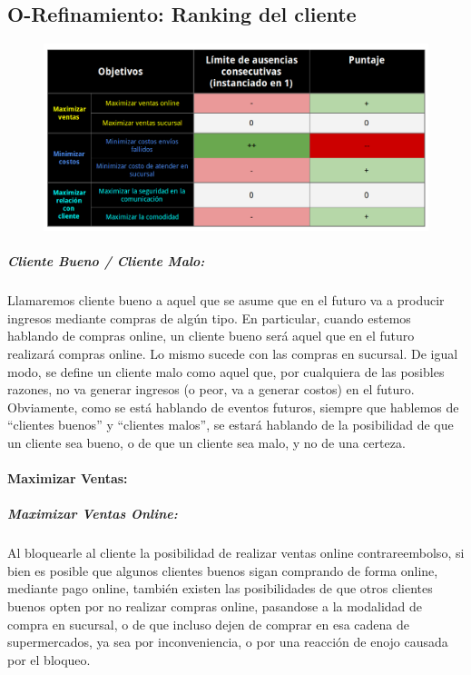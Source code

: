 \newpage
\subsection{O-Refinamiento: Ranking del cliente}
\begin{figure}[H]
  \includegraphics[width=\linewidth]{tp1/images/objetivo-blando-ranking-cliente.png}
\end{figure}

\subparagraph{Cliente Bueno / Cliente Malo:}

Llamaremos cliente bueno a aquel que se asume que en el futuro va a producir
ingresos mediante compras de algún tipo. En particular, cuando estemos
hablando de compras online, un cliente bueno será aquel que en el futuro
realizará compras online. Lo mismo sucede con las compras en sucursal. De
igual modo, se define un cliente malo como aquel que, por cualquiera de las
posibles razones, no va generar ingresos (o peor, va a generar costos) en el
futuro. Obviamente, como se está hablando de eventos futuros, siempre que
hablemos de ``clientes buenos'' y ``clientes malos'', se estará hablando de la
posibilidad de que un cliente sea bueno, o de que un cliente sea malo, y no de
una certeza.

\paragraph{Maximizar Ventas:}

\subparagraph{Maximizar Ventas Online:}

Al bloquearle al cliente la posibilidad de realizar ventas online
contrareembolso, si bien es posible que algunos clientes buenos sigan
comprando de forma online, mediante pago online, también existen las
posibilidades de que otros clientes buenos opten por no realizar compras
online, pasandose a la modalidad de compra en sucursal, o de que incluso dejen
de comprar en esa cadena de supermercados, ya sea por inconveniencia, o por
una reacción de enojo causada por el bloqueo.

